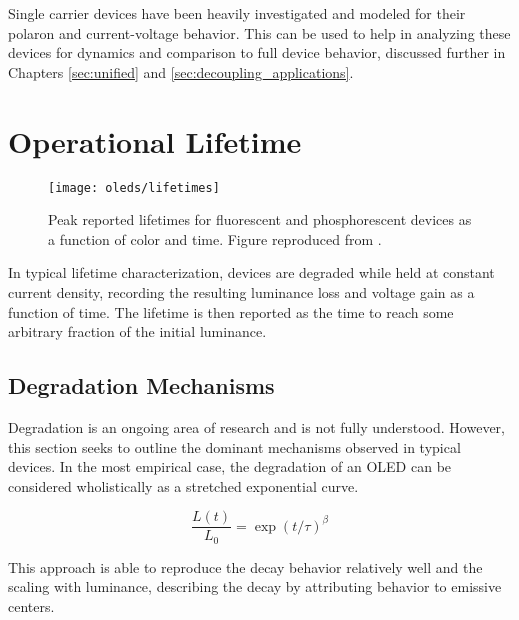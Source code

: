 \documentclass[../thesis.tex]{subfiles}
\begin{document}
Single carrier devices have been heavily investigated and modeled for their polaron and current-voltage behavior.\supercite{Pope1999,Mark1962,Lampert2002a}
This can be used to help in analyzing these devices for dynamics and comparison to full device behavior, discussed further in Chapters \ref{sec:unified} and \ref{sec:decoupling_applications}.

\section{Operational Lifetime}

\begin{wrapfigure}{r}{.5\textwidth}
\texttt{[image: oleds/lifetimes]}
\caption{Peak reported lifetimes for fluorescent and phosphorescent devices as a function of color and time.  Figure reproduced from \textcite{Scholz2015}.}
\label{fig:oleds_lifetimes}
\end{wrapfigure}

In typical lifetime characterization, devices are degraded while held at constant current density, recording the resulting luminance loss and voltage gain as a function of time.  
The lifetime is then reported as the time to reach some arbitrary fraction of the initial luminance.




\subsection{Degradation Mechanisms}\label{sec:degradation_mechanisms}

Degradation is an ongoing area of research and is not fully understood.
However, this section seeks to outline the dominant mechanisms observed in typical devices.
In the most empirical case, the degradation of an OLED can be considered wholistically as a stretched exponential curve.\supercite{Scholz2015,Fry2005a}

\begin{equation}
\frac{L(t)}{L_0}=\exp (t/\tau)^\beta
\label{eqn:stretched_exponential}
\end{equation}

This approach is able to reproduce the decay behavior relatively well and the scaling with luminance,  describing the decay by attributing behavior to emissive centers.
\end{document}
